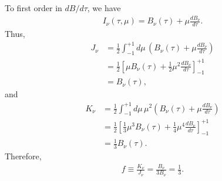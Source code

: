 \begin{problem}
To first order in $dB/d\tau$, we have
\begin{align}
I_\nu(\tau,\mu) = B_\nu(\tau) + \mu\frac{dB_\nu}{d\tau}.
\end{align}
Thus,
\begin{align}
J_\nu &= \frac{1}{2}\int_{-1}^{+1}\!\!d\mu\,\left(B_\nu(\tau) + \mu\frac{dB_\nu}{d\tau}\right)\\
&= \frac{1}{2}\left[\mu B_\nu(\tau) + \frac{1}{2}\mu^2\frac{dB_\nu}{d\tau}\right]_{-1}^{+1}\\
&= B_\nu(\tau),
\end{align}
and
\begin{align}
K_\nu &= \frac{1}{2}\int_{-1}^{+1}\!\!d\mu\,\mu^2\left(B_\nu(\tau) + \mu\frac{dB_\nu}{d\tau}\right)\\
&= \frac{1}{2}\left[\frac{1}{3}\mu^3 B_\nu(\tau) + \frac{1}{4}\mu^4\frac{dB_\nu}{d\tau}\right]_{-1}^{+1}\\
&= \frac{1}{3}B_\nu(\tau).
\end{align}
Therefore,
\begin{align}
f \equiv \frac{K_\nu}{J_\nu} = 
\frac{B_\nu}{3B_\nu} = \frac{1}{3}.
\end{align}
\end{problem}

\newslide

